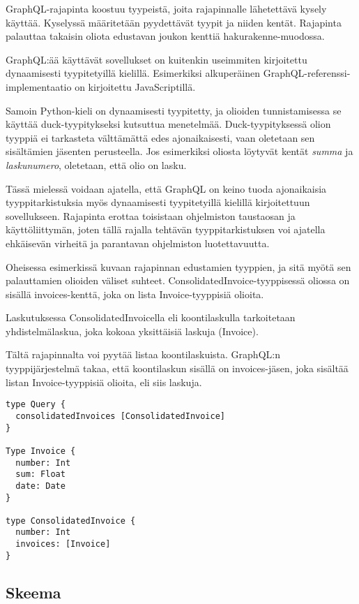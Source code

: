 GraphQL-rajapinta koostuu tyypeistä, joita rajapinnalle lähetettävä
kysely käyttää. Kyselyssä määritetään pyydettävät tyypit ja niiden
kentät. Rajapinta palauttaa takaisin oliota edustavan joukon kenttiä
\gls{hakurakenne}-muodossa. \cite{graphql:spec}

GraphQL:ää käyttävät sovellukset on kuitenkin useimmiten kirjoitettu
dynaamisesti tyypitetyillä kielillä. Esimerkiksi alkuperäinen
GraphQL-referenssi-implementaatio on kirjoitettu
JavaScriptillä.\cite{graphqlRefImple2021Oct}

Samoin Python-kieli on dynaamisesti tyypitetty, ja olioiden
tunnistamisessa se käyttää duck-tyypitykseksi kutsuttua menetelmää.
Duck-tyypityksessä olion tyyppiä ei tarkasteta välttämättä edes
ajonaikaisesti, vaan oletetaan sen sisältämien jäsenten
perusteella.\cite{pythonGloss2021Oct} Jos esimerkiksi oliosta löytyvät
kentät \emph{summa} ja \emph{laskunumero}, oletetaan, että olio on
lasku.

Tässä mielessä voidaan ajatella, että GraphQL on keino tuoda
ajonaikaisia tyyppitarkistuksia myös dynaamisesti tyypitetyillä kielillä
kirjoitettuun sovellukseen. Rajapinta erottaa toisistaan ohjelmiston
taustaosan ja käyttöliittymän, joten tällä rajalla tehtävän
tyyppitarkistuksen voi ajatella ehkäisevän virheitä ja parantavan
ohjelmiston luotettavuutta.

Oheisessa esimerkissä kuvaan rajapinnan edustamien tyyppien, ja sitä
myötä sen palauttamien olioiden väliset suhteet.
ConsolidatedInvoice-tyyppisessä oliossa on sisällä invoices-kenttä, joka
on lista Invoice-tyyppisiä olioita.

Laskutuksessa ConsolidatedInvoicella eli koontilaskulla tarkoitetaan
yhdistelmälaskua, joka kokoaa yksittäisiä laskuja (Invoice).

Tältä rajapinnalta voi pyytää listaa koontilaskuista. GraphQL:n
tyyppijärjestelmä takaa, että koontilaskun sisällä on invoices-jäsen,
joka sisältää listan Invoice-tyyppisiä olioita, eli siis laskuja.

\begin{verbatim}
type Query {
  consolidatedInvoices [ConsolidatedInvoice]
}

Type Invoice {
  number: Int
  sum: Float
  date: Date
}

type ConsolidatedInvoice {
  number: Int
  invoices: [Invoice]
}
\end{verbatim}

\hypertarget{skeema}{%
\subsection{Skeema}\label{skeema}}

